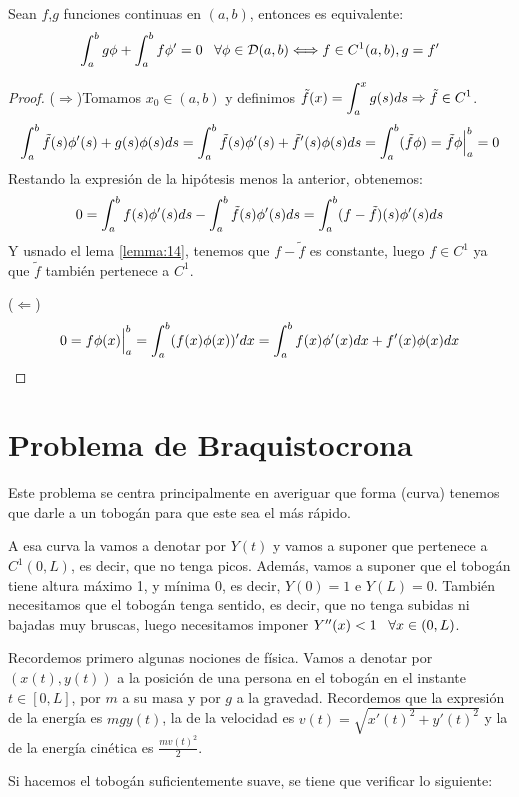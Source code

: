 \begin{lemma}
Sean $f$,$g$ funciones continuas en $(a,b)$, entonces es equivalente:
\[
\displaystyle\int_{ a }^{ b } g\phi+\displaystyle\int_{ a }^{ b } f\phi'=0 \;\;\; \forall\phi\in\mathcal{D}(a,b) \Longleftrightarrow f\in C^1(a,b), g=f'
\]
\end{lemma}

\begin{proof}

($\Rightarrow$)Tomamos $x_0\in(a,b)$ y definimos $\tilde{f}(x)=\displaystyle\int_{ a }^{ x } g(s)ds\Rightarrow \tilde{f}\in C^1$.
\[
\displaystyle\int_{ a }^{ b } \tilde{f}(s)\phi'(s)+g(s)\phi(s)ds=\displaystyle\int_{ a }^{ b } \tilde{f}(s)\phi'(s)+\tilde{f}'(s)\phi(s)ds=\displaystyle\int_{ a }^{ b } (\tilde{f}\phi)=\tilde{f}\phi\Big|_a^b=0
\]
Restando la expresión de la hipótesis menos la anterior, obtenemos:
\[
0=\displaystyle\int_{ a }^{ b } f(s)\phi'(s)ds-\displaystyle\int_{ a }^{ b } \tilde{f}(s)\phi'(s)ds=\displaystyle\int_{ a }^{ b } (f-\tilde{f})(s)\phi'(s)ds
\]
Y usnado el lema \ref{lemma:14}, tenemos que $f-\tilde{f}$ es constante, luego $f\in C^1$ ya que $\tilde{f}$ también pertenece a $C^1$.

($\Leftarrow$) 
\[
0=f\phi(x)\Big|_a^b=\displaystyle\int_{ a }^{ b } (f(x)\phi(x))'dx=\displaystyle\int_{ a }^{ b } f(x)\phi'(x)dx+f'(x)\phi(x)dx
\]
\end{proof}

\section{Problema de Braquistocrona}

Este problema se centra principalmente en averiguar que forma (curva) tenemos que darle a un tobogán para que este sea el más rápido.

A esa curva la vamos a denotar por $Y(t)$ y vamos a suponer que  pertenece a $C^1(0,L)$, es decir, que no tenga picos. Además, vamos a suponer que el tobogán tiene altura máximo 1, y mínima 0, es decir, $Y(0)=1$ e $Y(L)=0$. También necesitamos que el tobogán tenga sentido, es decir, que no tenga subidas ni bajadas muy bruscas, luego necesitamos imponer $Y''(x)<1 \;\;\; \forall x \in (0,L)$.

Recordemos primero algunas nociones de física. Vamos a denotar por $(x(t),y(t))$ a la posición de una persona en el tobogán en el instante $t\in[0,L]$, por $m$ a su masa y por $g$ a la gravedad. Recordemos que la expresión de la energía es $mgy(t)$, la de la velocidad es $v(t)=\sqrt{x'(t)^2+y'(t)^2}$ y la de la energía cinética es $\frac{mv(t)^2}{2}$.

Si hacemos el tobogán suficientemente suave, se tiene que verificar lo siguiente:

